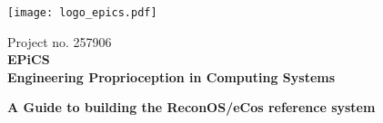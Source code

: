 \documentclass[DIV15,a4paper]{scrartcl}
\begin{document}
\begin{titlepage}

\sffamily


\texttt{[image: logo\_epics.pdf]} \hspace{0.5cm}

\begin{center}

	\vspace{1cm}
	
	Project no. 257906\\
	\textbf{EPiCS}\\
	\textbf{Engineering Proprioception in Computing Systems}
	
	\vspace{1cm}

	{\huge\textbf{A Guide to building the ReconOS/eCos reference system}}


	



\end{center}
\end{titlepage}
\end{document}
